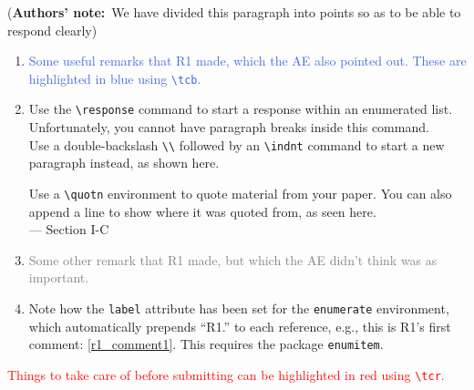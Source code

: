 \documentclass{article}
\newcommand{\tcr}[1]{\textcolor{Red}{#1}}
\newcommand{\tcg}[1]{\textcolor{Gray}{#1}}
\newcommand{\tcb}[1]{\textcolor{RoyalBlue}{#1}}
\newcommand{\response}[1]{\item[\textbf{Response}] #1}
\newcommand{\indnt}{\-\hspace{24pt}}
\begin{document}
(\textbf{Authors' note:}~We have divided this paragraph into points so as to be able to respond clearly)
\begin{enumerate}[label=R1.\arabic*,leftmargin=*]
	\item \tcb{Some useful remarks that R1 made, which the AE also pointed out. These are highlighted in blue using \texttt{\textbackslash{}tcb}.} \label{r1_comment1}
		\response{Use the \texttt{\textbackslash{}response} command to start a response within an enumerated list. Unfortunately, you cannot have paragraph breaks inside this command.\\
			\indnt Use a double-backslash \texttt{\textbackslash{}\textbackslash{}} followed by an \texttt{\textbackslash{}indnt} command to start a new paragraph instead, as shown here.
			\begin{quotn}
				Use a \texttt{\textbackslash{}quotn} environment to quote material from your paper. You can also append a line to show where it was quoted from, as seen here. \\ \-\hfill --- Section I-C
			\end{quotn}
		}

	\item \tcg{Some other remark that R1 made, but which the AE didn't think was as important.} \label{r1_comment2}
		\response{Note how the \texttt{label} attribute has been set for the \texttt{enumerate} environment, which automatically prepends ``R1.'' to each reference, e.g., this is R1's first comment: \ref{r1_comment1}. This requires the package \texttt{enumitem}.}
\end{enumerate}

\tcr{Things to take care of before submitting can be highlighted in red using \texttt{\textbackslash{}tcr}.}


\end{document}
